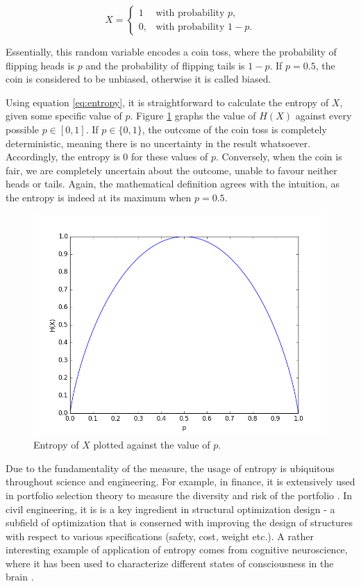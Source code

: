 \documentclass[12pt]{article}
\begin{document}
$$X = \begin{cases} 1 & \mbox{with probability } p, \\ 0, & \mbox{with probability } 1-p. \end{cases}$$

Essentially, this random variable encodes a coin toss, where the probability of flipping heads is $p$ and the probability of flipping tails is $1-p$. If $p=0.5$, the coin is considered to be unbiased, otherwise it is called biased.

Using equation \ref{eq:entropy}, it is straightforward to calculate the entropy of $X$, given some specific value of $p$. Figure \ref{fig:entropy} graphs the value of $H(X)$ against every possible $p \in \left[ 0, 1 \right]$. If $p \in \{0, 1\}$, the outcome of the coin toss is completely deterministic, meaning there is no uncertainty in the result whatsoever. Accordingly, the entropy is 0 for these values of $p$. Conversely, when the coin is fair, we are completely uncertain about the outcome, unable to favour neither heads or tails. Again, the mathematical definition agrees with the intuition, as the entropy is indeed at its maximum when $p = 0.5$.

\begin{figure} [h]
\begin{center}
\includegraphics[width=\textwidth]{entropy}
\caption{Entropy of $X$ plotted against the value of $p$.}
\label{fig:entropy}
\end{center}
\end{figure}

Due to the fundamentality of the measure, the usage of entropy is ubiquitous throughout science and engineering. For example, in finance, it is extensively used in portfolio selection theory to measure the diversity and risk of the portfolio \cite{entropy-finance}. In civil engineering, it is is a key ingredient in structural optimization design \cite{entropy-civil-eng} - a subfield of optimization that is conserned with improving the design of structures with respect to various specifications (safety, cost, weight etc.). A rather interesting example of application of entropy comes from cognitive neuroscience, where it has been used to characterize different states of consciousness in the brain \cite{entropy-consciousness}.
\end{document}
